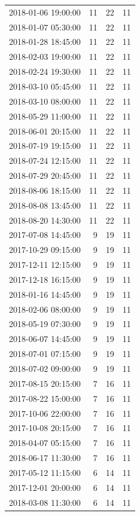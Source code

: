 \begin{tabular}{lrrr}
2018-01-06 19:00:00 & 11 & 22 & 11 \\
2018-01-07 05:30:00 & 11 & 22 & 11 \\
2018-01-28 18:45:00 & 11 & 22 & 11 \\
2018-02-03 19:00:00 & 11 & 22 & 11 \\
2018-02-24 19:30:00 & 11 & 22 & 11 \\
2018-03-10 05:45:00 & 11 & 22 & 11 \\
2018-03-10 08:00:00 & 11 & 22 & 11 \\
2018-05-29 11:00:00 & 11 & 22 & 11 \\
2018-06-01 20:15:00 & 11 & 22 & 11 \\
2018-07-19 19:15:00 & 11 & 22 & 11 \\
2018-07-24 12:15:00 & 11 & 22 & 11 \\
2018-07-29 20:45:00 & 11 & 22 & 11 \\
2018-08-06 18:15:00 & 11 & 22 & 11 \\
2018-08-08 13:45:00 & 11 & 22 & 11 \\
2018-08-20 14:30:00 & 11 & 22 & 11 \\
2017-07-08 14:45:00 & 9 & 19 & 11 \\
2017-10-29 09:15:00 & 9 & 19 & 11 \\
2017-12-11 12:15:00 & 9 & 19 & 11 \\
2017-12-18 16:15:00 & 9 & 19 & 11 \\
2018-01-16 14:45:00 & 9 & 19 & 11 \\
2018-02-06 08:00:00 & 9 & 19 & 11 \\
2018-05-19 07:30:00 & 9 & 19 & 11 \\
2018-06-07 14:45:00 & 9 & 19 & 11 \\
2018-07-01 07:15:00 & 9 & 19 & 11 \\
2018-07-02 09:00:00 & 9 & 19 & 11 \\
2017-08-15 20:15:00 & 7 & 16 & 11 \\
2017-08-22 15:00:00 & 7 & 16 & 11 \\
2017-10-06 22:00:00 & 7 & 16 & 11 \\
2017-10-08 20:15:00 & 7 & 16 & 11 \\
2018-04-07 05:15:00 & 7 & 16 & 11 \\
2018-06-17 11:30:00 & 7 & 16 & 11 \\
2017-05-12 11:15:00 & 6 & 14 & 11 \\
2017-12-01 20:00:00 & 6 & 14 & 11 \\
2018-03-08 11:30:00 & 6 & 14 & 11 \\

\end{tabular}
